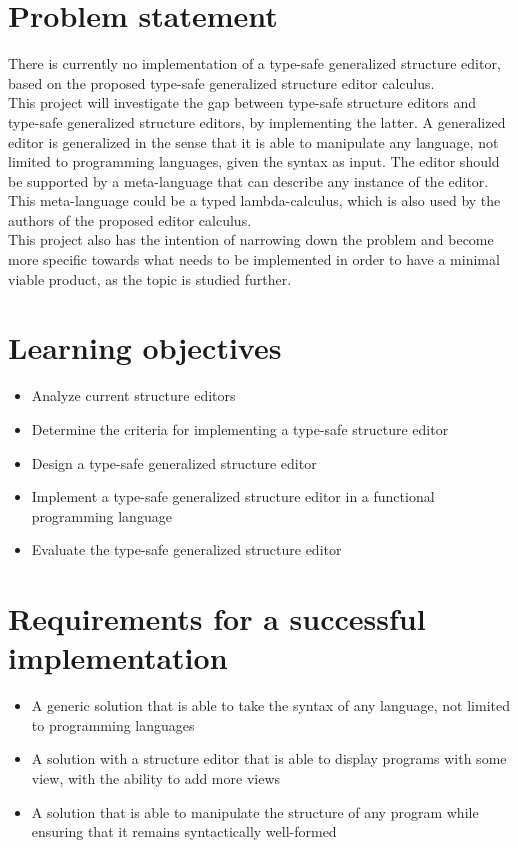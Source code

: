 \documentclass{article}
\begin{document}
\section{Problem statement}
There is currently no implementation of a type-safe generalized structure editor, based on the proposed type-safe generalized structure editor calculus. 
\\

This project will investigate the gap between type-safe structure editors and type-safe generalized structure editors, by implementing the latter. A generalized editor is generalized in the sense that it is able to manipulate any language, not limited to programming languages, given the syntax as input. The editor should be supported by a meta-language that can describe any instance of the editor. This meta-language could be a typed lambda-calculus, which is also used by the authors of the proposed editor calculus.
\\

This project also has the intention of narrowing down the problem and become more specific towards what needs to be implemented in order to have a minimal viable product, as the topic is studied further.

\section{Learning objectives}
\begin{itemize}
    \item Analyze current structure editors
    \item Determine the criteria for implementing a type-safe structure editor
    \item Design a type-safe generalized structure editor
    \item Implement a type-safe generalized structure editor in a functional programming language
    \item Evaluate the type-safe generalized structure editor 
\end{itemize}

\section{Requirements for a successful implementation}
\begin{itemize}
    \item A generic solution that is able to take the syntax of any language, not limited to programming languages
    \item A solution with a structure editor that is able to display programs with some view, with the ability to add more views
    \item A solution that is able to manipulate the structure of any program while ensuring that it remains syntactically well-formed
\end{itemize}

\printbibliography
\end{document}
